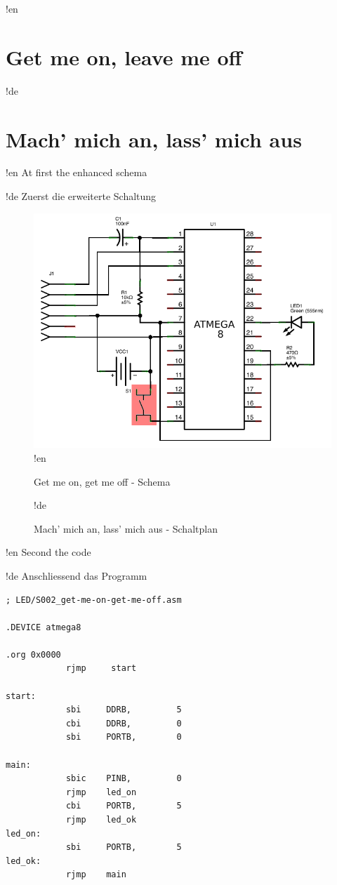 !en \section{Get me on, leave me off}
!de \section{Mach' mich an, lass' mich aus}

!en At first the enhanced schema

!de Zuerst die erweiterte Schaltung

\begin{figure}[htbp]
  \centering
  \includegraphics[width=120mm]{LED/S002_get-me-on-get-me-off_Circuit_schema.png}
!en   \caption{Get me on, get me off - Schema}
!de   \caption{Mach' mich an, lass' mich aus - Schaltplan}
  \label{atmega8-get-me-on-get-me-off-schema}
  \label{atmega8-get-me-on-get-me-off-schema}
\end{figure}


!en Second the code

!de Anschliessend das Programm


\begin{lstlisting}
; LED/S002_get-me-on-get-me-off.asm

.DEVICE atmega8

.org 0x0000
            rjmp     start

start:
            sbi     DDRB,         5
            cbi     DDRB,         0
            sbi     PORTB,        0

main:
            sbic    PINB,         0
            rjmp    led_on
            cbi     PORTB,        5
            rjmp    led_ok
led_on:
            sbi     PORTB,        5
led_ok:
            rjmp    main
\end{lstlisting}


